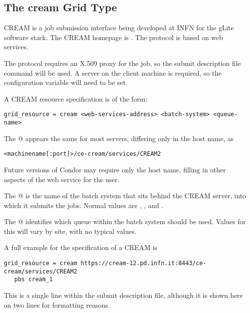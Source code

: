 
\subsection{\label{sec:CREAM}The cream Grid Type }

CREAM is a job submission interface being developed at INFN for the
gLite software stack. 
The CREAM homepage is .
The protocol is based on web services.

The protocol requires an X.509 proxy for the job,
so the submit description file command 
will be used.
A  server on the client machine is required,
so the configuration variable 
will need to be set. 

A CREAM resource specification is of the form:
\footnotesize
\begin{verbatim}
grid_resource = cream <web-services-address> <batch-system> <queue-name>
\end{verbatim}
\normalsize
The @ appears the same for most servers,
differing only in the host name, as
\begin{verbatim}
<machinename[:port]>/ce-cream/services/CREAM2
\end{verbatim}
Future versions of Condor may require only the host name, 
filling in other aspects of the web service for the user.

The @ is the name of the batch system that sits behind
the CREAM server,
into which it submits the jobs.
Normal values are \verb@pbs@, \verb@lsf@, and \verb@condor@.

The @ identifies which queue within the batch system
should be used.
Values for this will vary by site, with no typical values.

A full example for the specification of a CREAM  is
\footnotesize
\begin{verbatim}
grid_resource = cream https://cream-12.pd.infn.it:8443/ce-cream/services/CREAM2
   pbs cream_1
\end{verbatim}
\normalsize
This is a single line within the submit description file,
although it is shown here on two lines for formatting reasons.

